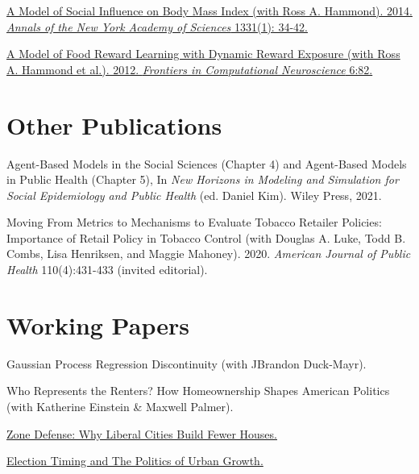 \documentclass[margin,line]{res}
\newenvironment{publist}{
	\begin{list}{}{%
			\setlength{\itemsep}{0.15in}
			\setlength{\parsep}{0in} \setlength{\parskip}{0in}
			\setlength{\topsep}{0in} \setlength{\partopsep}{0in} 
			\setlength{\leftmargin}{0.15in}
			\setlength{\itemindent}{-0.15in}}}
		{\end{list}}
\begin{document}
\begin{resume}
\begin{publist}
	\item \href{https://joeornstein.github.io/publications/Hammond_et_al-2014-Annals_of_the_New_York_Academy_of_Sciences.pdf}{A Model of Social Influence on Body Mass Index (with Ross A. Hammond). 2014. \textit{Annals of the New York Academy of Sciences} 1331(1): 34-42.}
	
	\item \href{https://joeornstein.github.io/publications/Hammond-2012.pdf}{A Model of Food Reward Learning with Dynamic Reward Exposure (with Ross A. Hammond et al.). 2012. \textit{Frontiers in Computational Neuroscience} 6:82.}	
\end{publist}





\section{\sc Other Publications}

\begin{publist}
	\item Agent-Based Models in the Social Sciences (Chapter 4) and Agent-Based Models in Public Health (Chapter 5), In \textit{New Horizons in Modeling and Simulation for Social Epidemiology and Public Health} (ed. Daniel Kim). Wiley Press, 2021. 
	\item Moving From Metrics to Mechanisms to Evaluate Tobacco Retailer Policies: Importance of Retail Policy in Tobacco Control (with Douglas A. Luke, Todd B. Combs, Lisa Henriksen, and Maggie Mahoney). 2020. \textit{American Journal of Public Health} 110(4):431-433 (invited editorial).
\end{publist}



\section{\sc Working Papers}

\begin{publist}
	\item Gaussian Process Regression Discontinuity (with JBrandon Duck-Mayr).
	\item Who Represents the Renters? How Homeownership Shapes American Politics (with Katherine Einstein \& Maxwell Palmer). 
	\item \href{https://joeornstein.github.io/publications/ornstein-zone-defense.pdf}{Zone Defense: Why Liberal Cities Build Fewer Houses.}
	\item \href{https://joeornstein.github.io/publications/Ornstein-ElectionTiming.pdf}{Election Timing and The Politics of Urban Growth.}
\end{publist}


\end{resume}
\end{document}
